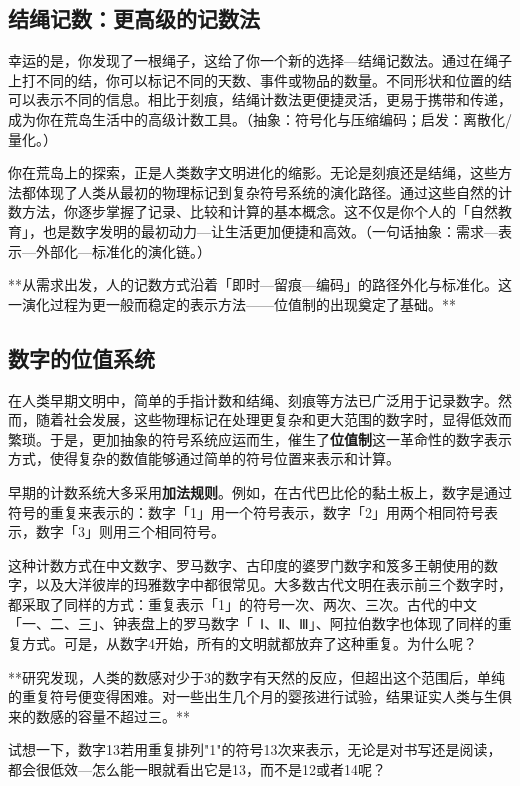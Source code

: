 \subsection*{结绳记数：更高级的记数法}

幸运的是，你发现了一根绳子，这给了你一个新的选择---结绳记数法。通过在绳子上打不同的结，你可以标记不同的天数、事件或物品的数量。不同形状和位置的结可以表示不同的信息。相比于刻痕，结绳计数法更便捷灵活，更易于携带和传递，成为你在荒岛生活中的高级计数工具。{（抽象：符号化与压缩编码；启发：离散化/量化。）}

你在荒岛上的探索，正是人类数字文明进化的缩影。无论是刻痕还是结绳，这些方法都体现了人类从最初的物理标记到复杂符号系统的演化路径。通过这些自然的计数方法，你逐步掌握了记录、比较和计算的基本概念。这不仅是你个人的「自然教育」，也是数字发明的最初动力---让生活更加便捷和高效。{（一句话抽象：需求—表示—外部化—标准化的演化链。）}

**从需求出发，人的记数方式沿着「即时—留痕—编码」的路径外化与标准化。这一演化过程为更一般而稳定的表示方法——位值制的出现奠定了基础。**

\subsection{数字的位值系统}

在人类早期文明中，简单的手指计数和结绳、刻痕等方法已广泛用于记录数字。然而，随着社会发展，这些物理标记在处理更复杂和更大范围的数字时，显得低效而繁琐。于是，更加抽象的符号系统应运而生，催生了{\bf 位值制}这一革命性的数字表示方式，使得复杂的数值能够通过简单的符号位置来表示和计算。

早期的计数系统大多采用{\bf 加法规则}。例如，在古代巴比伦的黏土板上，数字是通过符号的重复来表示的：数字「1」用一个符号表示，数字「2」用两个相同符号表示，数字「3」则用三个相同符号。

这种计数方式在中文数字、罗马数字、古印度的婆罗门数字和笈多王朝使用的数字，以及大洋彼岸的玛雅数字中都很常见。大多数古代文明在表示前三个数字时，都采取了同样的方式：重复表示「1」的符号一次、两次、三次。古代的中文「一、二、三」、钟表盘上的罗马数字「~Ⅰ、Ⅱ、Ⅲ」、阿拉伯数字也体现了同样的重复方式。可是，从数字4开始，所有的文明就都放弃了这种重复。为什么呢？

**研究发现，人类的数感对少于3的数字有天然的反应，但超出这个范围后，单纯的重复符号便变得困难。对一些出生几个月的婴孩进行试验，结果证实人类与生俱来的数感的容量不超过三。**

试想一下，数字13若用重复排列"1"的符号13次来表示，无论是对书写还是阅读，都会很低效---怎么能一眼就看出它是13，而不是12或者14呢？

